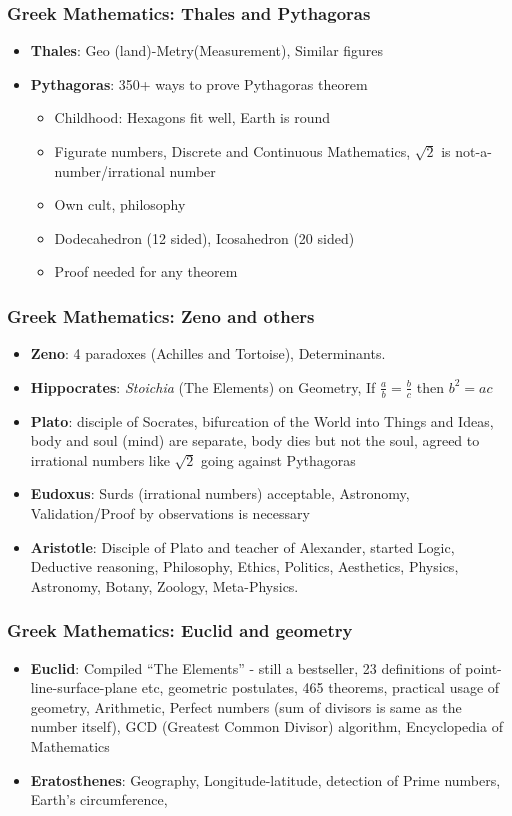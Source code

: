 \begin{frame}[fragile]
\frametitle{Greek Mathematics: Thales and Pythagoras}
\begin{itemize}[label=\textbullet, noitemsep,nolistsep]
\item \textbf{Thales}: Geo (land)-Metry(Measurement), Similar figures
\item \textbf{Pythagoras}: 350+ ways to prove Pythagoras theorem
	\begin{itemize}[label=\textbullet, noitemsep,nolistsep]
	\item Childhood: Hexagons fit well, Earth is round
	\item Figurate numbers, Discrete and Continuous Mathematics, $\sqrt{2}$ is not-a-number/irrational number
	\item Own cult, philosophy
	\item Dodecahedron (12 sided), Icosahedron (20 sided)
	\item Proof needed for any theorem
	\end{itemize}
\end{itemize}
\end{frame}

\begin{frame}[fragile]
\frametitle{Greek Mathematics: Zeno and others}
\begin{itemize}[label=\textbullet, noitemsep,nolistsep]
\item \textbf{Zeno}: 4 paradoxes (Achilles and Tortoise), Determinants.
\item \textbf{Hippocrates}: \textit{Stoichia} (The Elements) on Geometry, If $\frac{a}{b} = \frac{b}{c}$ then $b^2 = ac$
\item \textbf{Plato}: disciple of Socrates, bifurcation of the World into Things and Ideas, body and soul (mind) are separate, body dies but not the soul, agreed to irrational numbers like $\sqrt{2}$ going against Pythagoras
\item \textbf{Eudoxus}: Surds (irrational numbers) acceptable, Astronomy, Validation/Proof by observations is necessary
\item \textbf{Aristotle}: Disciple of Plato and teacher of Alexander, started Logic, Deductive reasoning, Philosophy, Ethics, Politics, Aesthetics, Physics, Astronomy, Botany, Zoology, Meta-Physics.
\end{itemize}
\end{frame}

\begin{frame}[fragile]
\frametitle{Greek Mathematics: Euclid and geometry}
\begin{itemize}[label=\textbullet, noitemsep,nolistsep]
\item \textbf{Euclid}: Compiled ``The Elements'' - still a bestseller, 23 definitions of point-line-surface-plane etc,  geometric postulates, 465 theorems, practical usage of geometry, Arithmetic,  Perfect numbers (sum of divisors is same as the number itself),  GCD (Greatest Common Divisor) algorithm, Encyclopedia of Mathematics
\item \textbf{Eratosthenes}: Geography, Longitude-latitude, detection of Prime numbers, Earth's circumference, 
\end{itemize}
\end{frame}



